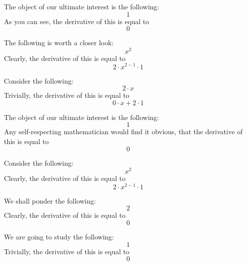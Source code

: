\documentclass{article}
\begin{document}
The object of our ultimate interest is the following:
\begin{equation}
1 
\end{equation}
As you can see, the derivative of this is equal to
\begin{equation}
0 
\end{equation}

The following is worth a closer look:
\begin{equation}
x ^{2 } 
\end{equation}
Clearly, the derivative of this is equal to
\begin{equation}
2 \cdot x ^{2 - 1 } \cdot 1 
\end{equation}

Consider the following:
\begin{equation}
2 \cdot x 
\end{equation}
Trivially, the derivative of this is equal to
\begin{equation}
0 \cdot x + 2 \cdot 1 
\end{equation}

The object of our ultimate interest is the following:
\begin{equation}
1 
\end{equation}
Any self-respecting mathematician would find it obvious, that the derivative of this is equal to
\begin{equation}
0 
\end{equation}

Consider the following:
\begin{equation}
x ^{2 } 
\end{equation}
Clearly, the derivative of this is equal to
\begin{equation}
2 \cdot x ^{2 - 1 } \cdot 1 
\end{equation}

We shall ponder the following:
\begin{equation}
2 
\end{equation}
Clearly, the derivative of this is equal to
\begin{equation}
0 
\end{equation}

We are going to study the following:
\begin{equation}
1 
\end{equation}
Trivially, the derivative of this is equal to
\begin{equation}
0 
\end{equation}
\end{document}

